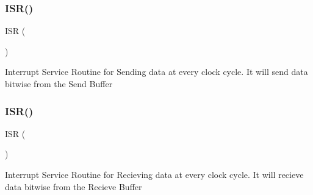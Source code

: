 \subsubsection{\texorpdfstring{ISR()}{ISR()}\hspace{0.1cm}{\footnotesize\ttfamily [2/3]}}
{\footnotesize\ttfamily I\+SR (\begin{DoxyParamCaption}\item[{P\+C\+I\+N\+T0\+\_\+vect}]{ }\end{DoxyParamCaption})}

Interrupt Service Routine for Sending data at every clock cycle. It will send data bitwise from the Send Buffer \mbox{\label{_i_s_r_8_c_a9c4665742c6b6eb1f0bb9dde41f7cba3}} 
\subsubsection{\texorpdfstring{ISR()}{ISR()}\hspace{0.1cm}{\footnotesize\ttfamily [3/3]}}
{\footnotesize\ttfamily I\+SR (\begin{DoxyParamCaption}\item[{P\+C\+I\+N\+T2\+\_\+vect}]{ }\end{DoxyParamCaption})}

Interrupt Service Routine for Recieving data at every clock cycle. It will recieve data bitwise from the Recieve Buffer 